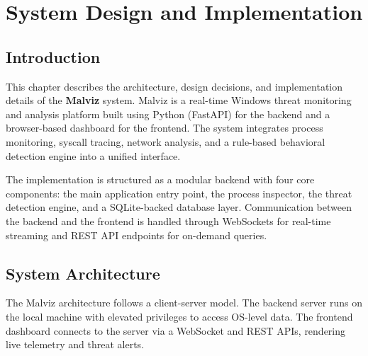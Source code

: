 
\chapter{System Design and Implementation}\doublespacing

\label{Chapter4}


\section{Introduction}

This chapter describes the architecture, design decisions, and implementation details of the \textbf{Malviz} system. Malviz is a real-time Windows threat monitoring and analysis platform built using Python (FastAPI) for the backend and a browser-based dashboard for the frontend. The system integrates process monitoring, syscall tracing, network analysis, and a rule-based behavioral detection engine into a unified interface.

The implementation is structured as a modular backend with four core components: the main application entry point, the process inspector, the threat detection engine, and a SQLite-backed database layer. Communication between the backend and the frontend is handled through WebSockets for real-time streaming and REST API endpoints for on-demand queries.

\section{System Architecture}

The Malviz architecture follows a client-server model. The backend server runs on the local machine with elevated privileges to access OS-level data. The frontend dashboard connects to the server via a WebSocket and REST APIs, rendering live telemetry and threat alerts.


